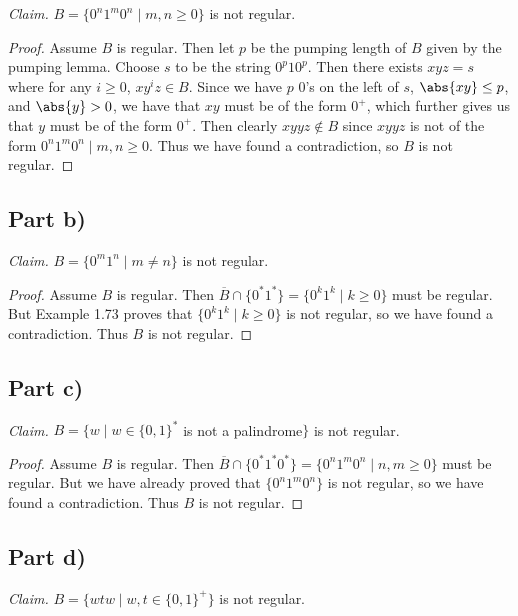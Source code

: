 \documentclass{abrice}
\newcommand{\comp}[1]{\overline{#1}}%
\begin{document}
\emph{Claim.} $B = \{0^n 1^m 0^n \mid m,n \geq 0\}$ is not regular.

\begin{proof}
  Assume $B$ is regular. Then let $p$ be the pumping length of $B$ given by the
  pumping lemma. Choose $s$ to be the string $0^p 1 0^p$. Then there exists $xyz
  = s$ where for any $i \geq 0$, $x y^i z \in B$. Since we have $p$ $0$'s on the
  left of $s$, $\abs{xy} \leq p$, and $\abs{y} > 0$, we have that $xy$ must be
  of the form $0^+$, which further gives us that $y$ must be of the form $0^+$.
  Then clearly $xyyz \notin B$ since $xyyz$ is not of the form $0^n 1^m 0^n \mid
  m,n \geq 0$. Thus we have found a contradiction, so $B$ is not regular.
\end{proof}

\subsection{Part b)}

\emph{Claim.} $B = \{0^m 1^n \mid m \neq n\}$ is not regular.

\begin{proof}
  Assume $B$ is regular. Then $\comp{B} \cap \{0^* 1^*\} = \{0^k 1^k \mid k \geq
  0\}$ must be regular. But Example 1.73 proves that $\{0^k 1^k \mid k \geq 0\}$
  is not regular, so we have found a contradiction. Thus $B$ is not regular.
\end{proof}

\subsection{Part c)}

\emph{Claim.} $B = \{ w \mid w \in {\{0,1\}}^*$ is not a palindrome$\}$ is not
regular.

\begin{proof}
  Assume $B$ is regular. Then $\comp{B} \cap \{0^* 1^* 0^*\} = \{ 0^n 1^m 0^n
  \mid n,m \geq 0\}$ must be regular. But we have already proved that $\{0^n 1^m
  0^n\}$ is not regular, so we have found a contradiction. Thus $B$ is not
  regular.
\end{proof}

\subsection{Part d)}

\emph{Claim.} $B = \{ wtw \mid w,t \in {\{0,1\}}^+ \}$ is not regular.
\end{document}
